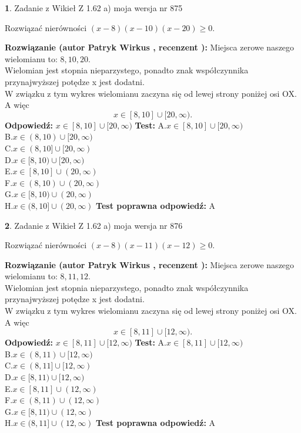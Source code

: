 \documentclass[12pt, a4paper]{article}
\theoremstyle{definition} %
\newtheorem{zad}{}
\newcommand{\zadStart}[1]{\begin{zad}#1\newline}
\newcommand{\zadStop}{\end{zad}}
\newcommand{\rozwStart}[2]{\noindent \textbf{Rozwiązanie (autor #1 , recenzent #2): }\newline}
\newcommand{\rozwStop}{\newline}
\newcommand{\odpStart}{\noindent \textbf{Odpowiedź:}\newline}
\newcommand{\odpStop}{\newline}
\newcommand{\testStart}{\noindent \textbf{Test:}\newline}
\newcommand{\testStop}{\newline}
\newcommand{\kluczStart}{\noindent \textbf{Test poprawna odpowiedź:}\newline}
\newcommand{\kluczStop}{\newline}
\begin{document}
\zadStart{Zadanie z Wikieł Z 1.62 a) moja wersja nr 875}

Rozwiązać nierówności $(x-8)(x-10)(x-20)\ge0$.
\zadStop
\rozwStart{Patryk Wirkus}{}
Miejsca zerowe naszego wielomianu to: $8, 10, 20$.\\
Wielomian jest stopnia nieparzystego, ponadto znak współczynnika przy\linebreak najwyższej potędze x jest dodatni.\\ W związku z tym wykres wielomianu zaczyna się od lewej strony poniżej osi OX. A więc $$x \in [8,10] \cup [20,\infty).$$
\rozwStop
\odpStart
$x \in [8,10] \cup [20,\infty)$
\odpStop
\testStart
A.$x \in [8,10] \cup [20,\infty)$\\
B.$x \in (8,10) \cup [20,\infty)$\\
C.$x \in (8,10] \cup [20,\infty)$\\
D.$x \in [8,10) \cup [20,\infty)$\\
E.$x \in [8,10] \cup (20,\infty)$\\
F.$x \in (8,10) \cup (20,\infty)$\\
G.$x \in [8,10) \cup (20,\infty)$\\
H.$x \in (8,10] \cup (20,\infty)$
\testStop
\kluczStart
A
\kluczStop



\zadStart{Zadanie z Wikieł Z 1.62 a) moja wersja nr 876}

Rozwiązać nierówności $(x-8)(x-11)(x-12)\ge0$.
\zadStop
\rozwStart{Patryk Wirkus}{}
Miejsca zerowe naszego wielomianu to: $8, 11, 12$.\\
Wielomian jest stopnia nieparzystego, ponadto znak współczynnika przy\linebreak najwyższej potędze x jest dodatni.\\ W związku z tym wykres wielomianu zaczyna się od lewej strony poniżej osi OX. A więc $$x \in [8,11] \cup [12,\infty).$$
\rozwStop
\odpStart
$x \in [8,11] \cup [12,\infty)$
\odpStop
\testStart
A.$x \in [8,11] \cup [12,\infty)$\\
B.$x \in (8,11) \cup [12,\infty)$\\
C.$x \in (8,11] \cup [12,\infty)$\\
D.$x \in [8,11) \cup [12,\infty)$\\
E.$x \in [8,11] \cup (12,\infty)$\\
F.$x \in (8,11) \cup (12,\infty)$\\
G.$x \in [8,11) \cup (12,\infty)$\\
H.$x \in (8,11] \cup (12,\infty)$
\testStop
\kluczStart
A
\kluczStop
\end{document}
